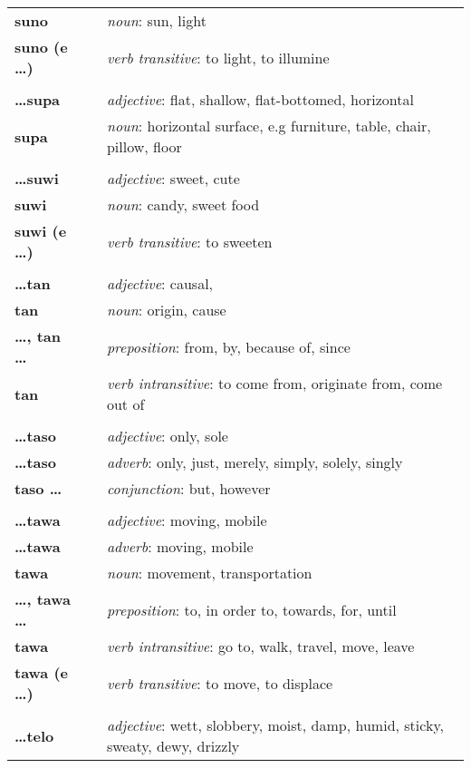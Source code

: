 \begin{supertabular}{p{2,5cm}|ll}
\textbf{suno} && \textit{noun}: sun, light \\ 
\textbf{suno (e \dots)} && \textit{verb transitive}: to light, to illumine \\ 
 && \\ %
 \textbf{\dots supa} && \textit{adjective}: flat, shallow, flat-bottomed, horizontal \\ 
\textbf{supa} && \textit{noun}: horizontal surface, e.g furniture, table, chair, pillow, floor \\ 
 && \\ %
\textbf{\dots suwi} && \textit{adjective}: sweet, cute \\ 
\textbf{suwi} && \textit{noun}: candy, sweet food \\ 
\textbf{suwi (e \dots)} && \textit{verb transitive}: to sweeten \\ 
 && \\ %
\textbf{\dots tan} && \textit{adjective}: causal, \\ 
\textbf{tan} && \textit{noun}: origin, cause \\ 
\textbf{\dots , tan \dots} && \textit{preposition}: from, by, because of, since \\ 
\textbf{tan} && \textit{verb intransitive}: to come from, originate from, come out of \\ 
 && \\ %
\textbf{\dots taso} && \textit{adjective}: only, sole \\ 
\textbf{\dots taso} && \textit{adverb}: only, just, merely, simply, solely, singly \\ 
\textbf{taso \dots} && \textit{conjunction}: but, however \\ 
 && \\ %
\textbf{\dots tawa} && \textit{adjective}: moving, mobile \\ 
\textbf{\dots tawa} && \textit{adverb}: moving, mobile \\ 
\textbf{tawa} && \textit{noun}: movement, transportation \\ 
\textbf{\dots , tawa \dots} && \textit{preposition}: to, in order to, towards, for, until \\ 
\textbf{tawa} && \textit{verb intransitive}: go to, walk, travel, move, leave \\ 
\textbf{tawa (e \dots)} && \textit{verb transitive}: to move, to displace \\ 
 && \\ %
\textbf{\dots telo} && \textit{adjective}: wett, slobbery, moist, damp, humid, sticky, sweaty, dewy, drizzly \\ 

\end{supertabular}
